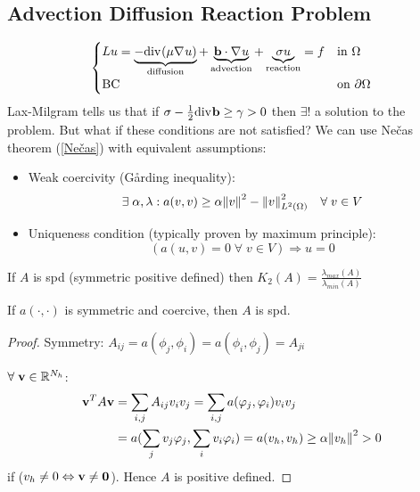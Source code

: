 \subsection{Advection Diffusion Reaction Problem}
\begin{equation*}
   \begin{cases}
       Lu = \underbrace{-\text{div}\mspace{1mu} (\mu\nabla\mspace{1mu} u)}_{\text{diffusion}} + \underbrace{\textbf{b} \cdot \nabla\mspace{1mu} u}_{\text{advection}} + \underbrace{\sigma u}_{\text{reaction}} = f & \text{in }\Omega \\
       \text{BC }& \text{on }\partial\Omega\\
   \end{cases}
\end{equation*}
Lax-Milgram tells us that if \(\sigma - \frac{1}{2}\text{div}\mspace{1mu}\textbf{b} \geq \gamma > 0\) then \(\exists!\) a solution to the problem. But what if these conditions are not satisfied? We can use Nečas theorem (\eqref{Nečas}) with equivalent assumptions:
\begin{itemize}
    \item Weak coercivity (Gårding inequality): 
    \[
        \exists \; \alpha, \lambda : a(v,v) \geq \alpha \norm{v}^2-\norm{v}_{L^2(\Omega)}^2 \quad \forall \; v \in V
    \]
    \item Uniqueness condition (typically proven by maximum principle):
    \[
        (a(u,v) = 0 \; \forall \; v \in V) \Rightarrow u = 0
    \]
\end{itemize}
If \(A\) is spd (symmetric positive defined) then \(K_2(A) = \frac{\lambda_{max}(A)}{\lambda_{min}(A)}\)

    \begin{proposition}
        If \(a(\cdot,\cdot)\) is symmetric and coercive, then \(A\) is spd.
    \end{proposition}

    \begin{proof}
        Symmetry: \(A_{ij} = a(\phi_j,\phi_i) = a(\phi_i,\phi_j) = A_{ji}\)

        \(\forall \; \textbf{v} \in \mathbb{R}^{N_h}\):
        \begin{align*}
            \textbf{v}^TA\textbf{v} & = \sum_{i,j}A_{ij}v_iv_j = \sum_{i,j}a(\varphi_j, \varphi_i)v_i v_j \\
            & = a(\sum_j v_j \varphi_j, \sum_i v_i \varphi_i) = a(v_h, v_h) \geq \alpha\norm{v_h}^2 > 0
        \end{align*}
    if (\(v_h \neq 0 \Leftrightarrow \textbf{v} \neq \textbf{0}\)). Hence \(A\) is positive defined.
    \end{proof}

